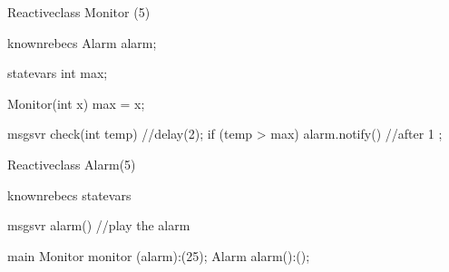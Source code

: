 Reactiveclass Monitor (5)
{
    knownrebecs {
        Alarm alarm;
    }
    
    statevars {
     int max;
    }
    
    Monitor(int x)
    {
        max = x;
    }

    msgsvr check(int temp) {
        //delay(2);
        if (temp > max) {
           alarm.notify() //after 1
           ;
        }
    }
}

Reactiveclass Alarm(5)
{
    knownrebecs {  }
    statevars {  }

    msgsvr alarm() 
    {
        //play the alarm
    }
}
main
{
   Monitor monitor (alarm):(25);
   Alarm alarm():();
}

